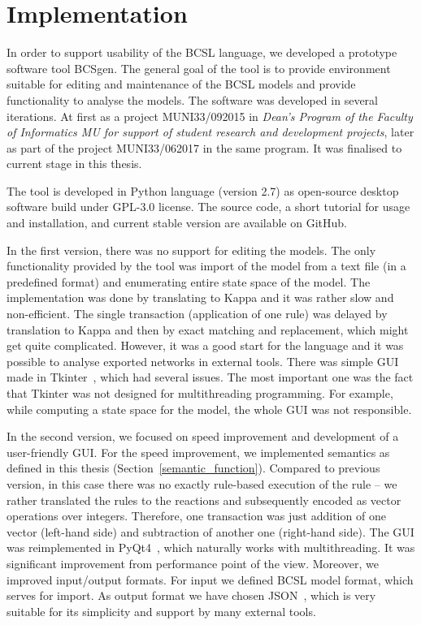 \documentclass[12pt, twoside]{fithesis2} %
\begin{document}
\chapter{Implementation}
\label{implementation}

In order to support usability of the BCSL language, we developed a prototype software tool BCSgen. The general goal of the tool is to provide environment suitable for editing and maintenance of the BCSL models and provide functionality to analyse the models. The software was developed in several iterations. At first as a project MUNI33/092015 in \emph{Dean's Program of the Faculty of Informatics MU for support of student research and development projects}, later as part of the project MUNI33/062017 in the same program. It was finalised to current stage in this thesis.

The tool is developed in Python language (version 2.7) as open-source desktop software build under GPL-3.0 license. The source code, a short tutorial for usage and installation, and current stable version are available on GitHub\footnotemark[1].

In the first version, there was no support for editing the models. The only functionality provided by the tool was import of the model from a text file (in a predefined format) and enumerating entire state space of the model. The implementation was done by translating to Kappa and it was rather slow and non-efficient. The single transaction (application of one rule) was delayed by translation to Kappa and then by exact matching and replacement, which might get quite complicated. However, it was a good start for the language and it was possible to analyse exported networks in external tools. There was simple GUI made in Tkinter~\cite{Tkinter}, which had several issues. The most important one was the fact that Tkinter was not designed for multithreading programming. For example, while computing a state space for the model, the whole GUI was not responsible.

In the second version, we focused on speed improvement and development of a user-friendly GUI. For the speed improvement, we implemented semantics as defined in this thesis (Section~\ref{semantic_function}). Compared to previous version, in this case there was no exactly rule-based execution of the rule -- we rather translated the rules to the reactions and subsequently encoded as vector operations over integers. Therefore, one transaction was just addition of one vector (left-hand side) and subtraction of another one (right-hand side). The GUI was reimplemented in PyQt4~\cite{summerfield2007rapid}, which naturally works with multithreading. It was significant improvement from performance point of the view. Moreover, we improved input/output formats. For input we defined BCSL model format, which serves for import. As output format we have chosen JSON~\cite{json}, which is very suitable for its simplicity and support by many external tools.
\end{document}
